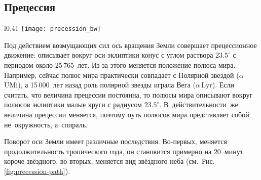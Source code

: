 \subsection{Прецессия}
\begin{wrapfigure}[15]{l}{0.41\tw}
    \vspace{-1pc}
    \centering
    \texttt{[image: precession\_bw]}
    \caption{Прецессионное движение северного полюса мира}
    \label{fig:precession-path}
\end{wrapfigure}
Под действием возмущающих сил ось вращения Земли совершает прецессионное движение: описывает вокруг оси эклиптики конус с углом раствора $23.5^\circ$ с периодом около  25\,765~лет. Из-за этого меняется положение полюса мира. Например, сейчас полюс мира практически совпадает с Полярной звездой ($\alpha$\,UMi), а 15\,000~лет назад роль полярной звезды играла Вега ($\alpha$\,Lyr). Если считать, что величина прецессии постоянна, то полюсы мира описывают вокруг полюсов эклиптики малые круги с радиусом $23.5^\circ$. В~действительности~же величина прецессии меняется, поэтому путь полюсов мира представляет собой не~окружность, а~спираль.

Поворот оси Земли имеет различные последствия. Во-первых, меняется продолжительность тропического года, он становится примерно на $20$~минут короче звёздного, во-вторых, меняется вид звёздного неба  (см.~Рис.\,\ref{fig:precession-path}).
